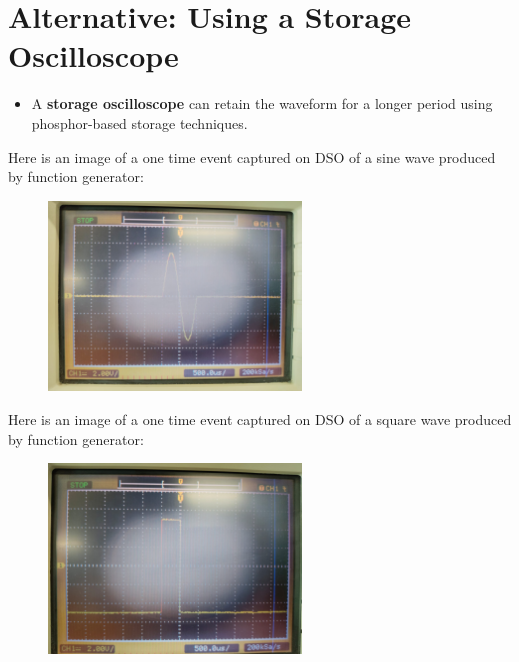 \documentclass{article}
\begin{document}
\section{Alternative: Using a Storage Oscilloscope}
\begin{itemize}
    \item A \textbf{storage oscilloscope} can retain the waveform for a longer period using phosphor-based storage techniques.
\end{itemize}
Here is an image of a one time event captured on DSO of a sine wave produced by function generator:
\begin{figure}[H]
\centering
\includegraphics[width=0.6\textwidth]{figs/ofig1.png}
\end{figure}
Here is an image of a one time event captured on DSO of a square wave produced by function generator:
\begin{figure}[H]
\centering
\includegraphics[width=0.6\textwidth]{figs/ofig2.png}
\end{figure}
\end{document}
